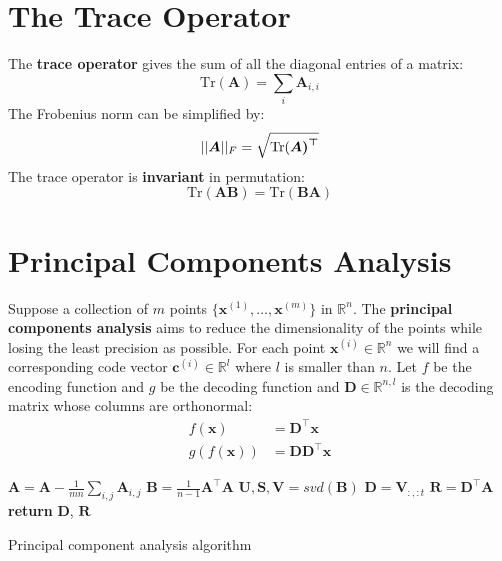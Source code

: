 \documentclass[12pt]{report}
\begin{document}
    \section{The Trace Operator}
        The \textbf{trace operator} gives the sum of all the diagonal entries of a matrix:
        \begin{equation}
            \text{Tr}(\boldsymbol{A}) = \sum_i{\boldsymbol{A}_{i,i}}
        \end{equation}
        The Frobenius norm can be simplified by:
        \begin{equation}
            ||\boldsymbol{A}||\\_F = \sqrt{\text{Tr}(\boldsymbol{A)^\top }} 
        \end{equation}
        The trace operator is \textbf{invariant} in permutation:
        \begin{equation}
            \text{Tr}(\boldsymbol{A}\boldsymbol{B}) = \text{Tr}(\boldsymbol{B}\boldsymbol{A})
        \end{equation}
        
    \section{Principal Components Analysis}
        Suppose a collection of $m$ points $\{\boldsymbol{x}^{(1)}, \dots, \boldsymbol{x}^{(m)}\}$ in $\mathbb{R}^n$. The \textbf{principal components analysis} aims to reduce the dimensionality of the points while losing the least precision as possible.
        For each point $\boldsymbol{x}^{(i)} \in \mathbb{R}^n$ we will find a corresponding code vector $\boldsymbol{c}^{(i)} \in \mathbb{R}^l$ where $l$ is smaller than $n$.
        Let $f$ be the encoding function and $g$ be the decoding function and $\boldsymbol{D} \in \mathbb{R}^{n,l}$ is the decoding matrix whose columns are orthonormal:
        \begin{align}
            f(\boldsymbol{x}) &= \boldsymbol{D}^\top \boldsymbol{x} \\
            g(f(\boldsymbol{x})) &= \boldsymbol{D}\boldsymbol{D}^\top \boldsymbol{x}
        \end{align}
        
        \begin{algorithm}[H]
            \SetAlgoLined
            \DontPrintSemicolon
            $\boldsymbol{A} = \boldsymbol{A} - \frac{1}{mn} \sum_{i,j}{\boldsymbol{A}_{i,j}}$\;
            $\boldsymbol{B} = \frac{1}{n - 1} \boldsymbol{A}^\top \boldsymbol{A}$\;
            $\boldsymbol{U}, \boldsymbol{S}, \boldsymbol{V} = svd(\boldsymbol{B})$\;
            $\boldsymbol{D} = \boldsymbol{V}_{:, :t}$\;
            $\boldsymbol{R} = \boldsymbol{D}^\top \boldsymbol{A}$\;
            \textbf{return} $\boldsymbol{D}$, $\boldsymbol{R}$
            \caption{Principal component analysis algorithm}
        \end{algorithm}
        
\end{document}
